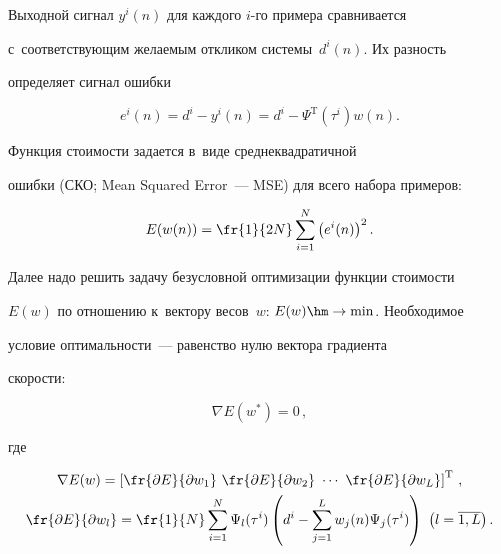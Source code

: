   Выходной сигнал $y^i(n)$ для каждого $i$-го примера сравнивается 


с~соответствующим желаемым откликом сис\-те\-мы~$d^i(n)$. Их разность 


определяет сигнал ошибки 


$$


e^i(n)= d^i - y ^i(n) = d^i - \Psi^{\mathrm{T}}(\tau^i) w(n).


$$





 Функция стоимости задается в~виде среднеквадратичной 


ошибки (СКО; Mean Squared Error~--- MSE) для всего набора примеров: 


  \begin{equation}


  E(w(n))=\fr{1}{2N} \sum\limits^N_{i=1} \left( e^i(n)\right)^2.


  \label{e19-kon}


  \end{equation}


  


  Далее надо решить задачу безусловной оптимизации функции стоимости 


$E(w)$ по отношению к~вектору весов~$w$: $E(w)\hm\to \min$. Необходимое 


условие оптимальности~--- равенство нулю вектора градиента  


ско\-рости: 


$$


\nabla E(w^*) =0\,,


$$


 где 


 \begin{multline*}


  \nabla E(w) =  \left[ \fr{\partial E}{\partial w_1}\ \fr{\partial E}{\partial w_2}\ 


\cdots\ \fr{\partial E}{\partial w_L}\right]^{\mathrm{T}}\,,


\\


  \fr{\partial E}{\partial w_l}=\fr{1}{N} \sum\limits^N_{i=1} \Psi_l(\tau^i) \left( 


  d^i-\sum\limits^L_{j=1} w_j(n)\Psi_j(\tau^i)\right)\ \left( l=\overline{1,L}\right).


 \end{multline*}


